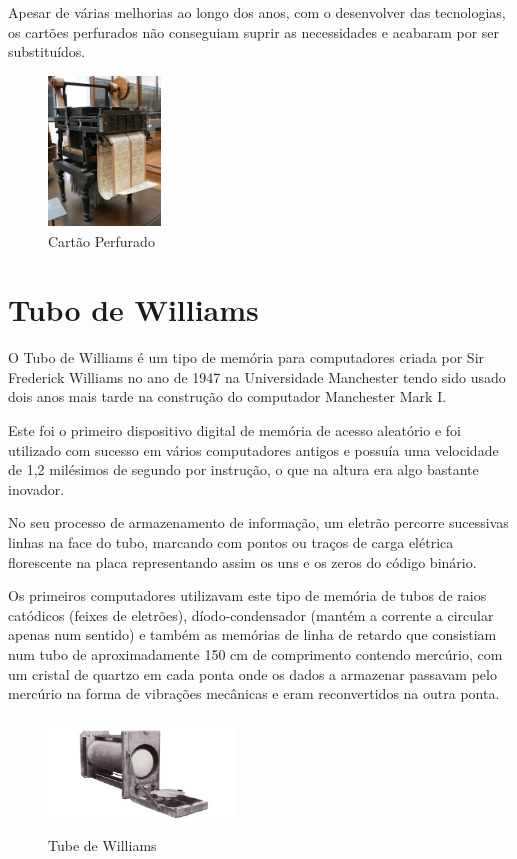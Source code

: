 \documentclass{report}
\begin{document}
		Apesar de várias melhorias ao longo dos anos, com o desenvolver das tecnologias, os cartões perfurados não conseguiam suprir as necessidades e acabaram por ser substituídos.
		
		\begin{figure}[h]
		\centering
		\includegraphics[width=3cm, height=4cm]{cartaoperfurado.jpg}
		\caption{Cartão Perfurado}
		\end{figure}
\newpage

		\section{Tubo de Williams}
		O Tubo de Williams é um tipo de memória para computadores criada por Sir Frederick Williams no ano de 1947 na Universidade Manchester tendo sido usado dois anos mais tarde na construção do computador Manchester Mark I.
	
	Este foi o primeiro dispositivo digital de memória de acesso aleatório e foi utilizado com sucesso em vários computadores antigos e possuía uma velocidade de 1,2 milésimos de segundo por instrução, o que na altura era algo bastante inovador.
	
	No seu processo de armazenamento de informação, um eletrão percorre sucessivas linhas na face do tubo, marcando com pontos ou traços de carga elétrica florescente na placa representando assim os uns e os zeros do código binário.
	
	Os primeiros computadores utilizavam este tipo de memória de tubos de raios catódicos (feixes de eletrões), díodo-condensador (mantém a corrente a circular apenas num sentido) e também as memórias de linha de retardo que consistiam num tubo de aproximadamente 150 cm de comprimento contendo mercúrio, com um cristal de quartzo em cada ponta onde os dados a armazenar passavam pelo mercúrio na forma de vibrações mecânicas e eram reconvertidos na outra ponta.
\\

	\begin{figure}[b]
		\centering
		\includegraphics[width=5cm, height=3cm]{williamstube.jpg}
		\caption{Tube de Williams}
		\end{figure}	
\newpage
\end{document}
